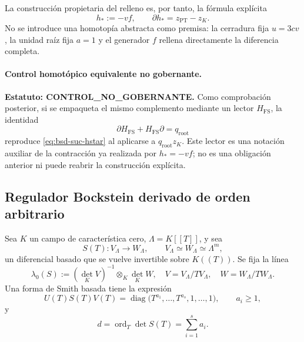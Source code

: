 La construcción propietaria del relleno es, por tanto, la fórmula explícita
\begin{equation}\label{eq:bsd-suc-hstar}
 h_*:=-vf,
 \qquad
 \partial h_*=z_{\mathrm{PT}}-z_K.
\end{equation}
No se introduce una homotopía abstracta como premisa: la cerradura fija
\(u=3cv\), la unidad raíz fija \(a=1\) y el generador \(f\) rellena
directamente la diferencia completa.

\paragraph{Control homotópico equivalente no gobernante.}
\noindent\textbf{Estatuto: CONTROL\_NO\_GOBERNANTE.}
Como comprobación posterior, si se empaqueta el mismo complemento mediante
un lector \(H_{\mathrm{FS}}\), la identidad
\begin{equation}\label{eq:bsd-suc-hfs}
 \partial H_{\mathrm{FS}}+H_{\mathrm{FS}}\partial
 =q_{\mathrm{root}}
\end{equation}
reproduce \eqref{eq:bsd-suc-hstar} al aplicarse a
\(q_{\mathrm{root}}z_K\). Este lector es una notación auxiliar de la
contracción ya realizada por \(h_*=-vf\); no es una obligación anterior ni
puede reabrir la construcción explícita.

\subsection*{Regulador Bockstein derivado de orden arbitrario}

Sea \(K\) un campo de característica cero,
\(\Lambda=K[[T]]\), y sea
\begin{equation}\label{eq:bsd-suc-S}
 S(T):V_{\Lambda}\longrightarrow W_{\Lambda},
 \qquad
 V_{\Lambda}\simeq W_{\Lambda}\simeq\Lambda^{m},
\end{equation}
un diferencial basado que se vuelve invertible sobre \(K((T))\). Se fija
la línea
\begin{equation}\label{eq:bsd-suc-lambda0}
 \lambda_0(S):=(\det_K V)^{-1}\otimes_K\det_K W,
 \quad
 V=V_{\Lambda}/TV_{\Lambda},\quad
 W=W_{\Lambda}/TW_{\Lambda}.
\end{equation}
Una forma de Smith basada tiene la expresión
\begin{equation}\label{eq:bsd-suc-smith}
 U(T)S(T)V(T)
 =\operatorname{diag}
 \bigl(T^{a_1},\ldots,T^{a_s},1,\ldots,1\bigr),
 \qquad a_i\geq1,
\end{equation}
y
\begin{equation}\label{eq:bsd-suc-orden}
 d=\operatorname{ord}_{T}\det S(T)=\sum_{i=1}^{s}a_i.
\end{equation}

